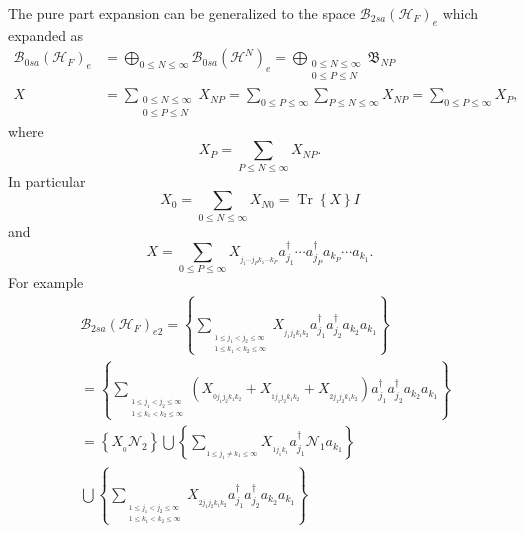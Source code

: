 \documentclass[aps,preprint]{revtex4}%
\begin{document}
The pure part expansion can be generalized to the space $\mathcal{B}%
_{2sa}\left(  \mathcal{H}_{F}\right)  _{e}$ which expanded as
\begin{align}
\mathcal{B}_{0sa}\left(  \mathcal{H}_{F}\right)  _{e}  &  =%
{\displaystyle\bigoplus\limits_{0\leq N\leq\infty}}
\mathcal{B}_{0sa}\left(  \mathcal{H}^{N}\right)  _{e}=%
{\displaystyle\bigoplus\limits_{\substack{0\leq N\leq\infty\\0\leq P\leq N}}}
\mathfrak{B}_{NP}\\
X  &  =\sum_{\substack{0\leq N\leq\infty\\0\leq P\leq N}}X_{NP}=\sum_{0\leq
P\leq\infty}\sum_{P\leq N\leq\infty}X_{NP}=\sum_{0\leq P\leq\infty}X_{P},
\end{align}
where
\begin{equation}
X_{P}=\sum_{P\leq N\leq\infty}X_{NP}.
\end{equation}
In particular
\begin{equation}
X_{0}=\sum_{0\leq N\leq\infty}X_{N0}=\operatorname*{Tr}\left\{  X\right\}  I
\end{equation}
and
\begin{equation}
X=\sum_{0\leq P\leq\infty}X_{_{j_{1}\cdots j_{P}k_{1}\cdots k_{P}}}a_{j_{1}%
}^{\dagger}\cdots a_{j_{P}}^{\dagger}a_{k_{P}}\cdots a_{k_{1}}.
\end{equation}
For example
\begin{align}
&  \mathcal{B}_{2sa}\left(  \mathcal{H}_{F}\right)  _{e2}=\left\{
\sum_{_{\substack{1\leq j_{1}<j_{2}\leq\infty\\1\leq k_{1}<k_{2}\leq\infty}%
}}X_{_{j_{1}j_{2}k_{1}k_{2}}}a_{j_{1}}^{\dagger}a_{j_{2}}^{\dagger}a_{k_{2}%
}a_{k_{1}}\right\} \\
&  =\left\{  \sum_{_{\substack{1\leq j_{1}<j_{2}\leq\infty\\1\leq k_{1}%
<k_{2}\leq\infty}}}\left(  X_{_{0j_{1}j_{2}k_{1}k_{2}}}+X_{_{1j_{1}j_{2}%
k_{1}k_{2}}}+X_{_{2j_{1}j_{2}k_{1}k_{2}}}\right)  a_{j_{1}}^{\dagger}a_{j_{2}%
}^{\dagger}a_{k_{2}}a_{k_{1}}\right\} \\
&  =\left\{  X_{_{0}}\mathcal{N}_{2}\right\}  \bigcup\left\{  \sum_{_{1\leq
j_{1}\neq k_{1}\leq\infty}}X_{_{1j_{1}k_{1}}}a_{j_{1}}^{\dagger}%
\mathcal{N}_{1}a_{k_{1}}\right\} \\
&  \bigcup\left\{  \sum_{_{\substack{1\leq j_{1}<j_{2}\leq\infty\\1\leq
k_{1}<k_{2}\leq\infty}}}X_{_{2j_{1}j_{2}k_{1}k_{2}}}a_{j_{1}}^{\dagger
}a_{j_{2}}^{\dagger}a_{k_{2}}a_{k_{1}}\right\}
\end{align}
\end{document}
